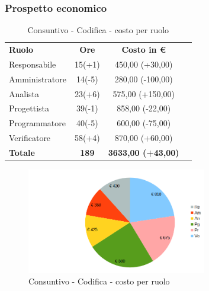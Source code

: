 \subsubsection{Prospetto economico}


\begin{table} [h!]
	\begin{center}
		\begin{tabular} { m{3 cm} c c c  }
			\rowcolor{lightgray}
			\textbf{Ruolo}  & \textbf{Ore} & \textbf{Costo in \euro} \\
			Responsabile    & 15(+1)      & 450,00 (+30,00) \\
			Amministratore  & 14(-5)      & 280,00 (-100,00)  \\
			Analista        & 23(+6)     & 575,00 (+150,00) \\
			Progettista     & 39(-1)          & 858,00 (-22,00) \\
			Programmatore   & 40(-5)        & 600,00 (-75,00) \\
			Verificatore    & 58(+4)        & 870,00 (+60,00) \\
			\textbf{Totale} & \textbf{189}         & \textbf{3633,00 (+43,00)} \\
			
		\end{tabular}
		\caption{Consuntivo - Codifica  - costo per ruolo}
	\end{center}
\end{table}
\begin{figure} [h!]
	\centering
	\includegraphics[width=0.7\textwidth]{res/img/grafici/consuntivo-torta-tb.png}
	\caption{Consuntivo - Codifica  - costo per ruolo} 
\end{figure}
